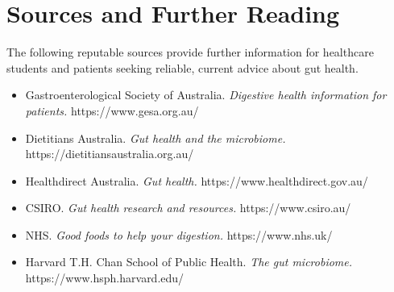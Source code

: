 \section*{Sources and Further Reading}
The following reputable sources provide further information for healthcare students and patients seeking reliable, current advice about gut health.

\begin{itemize}
    \item Gastroenterological Society of Australia. \textit{Digestive health information for patients.} https://www.gesa.org.au/
    \item Dietitians Australia. \textit{Gut health and the microbiome.} https://dietitiansaustralia.org.au/
    \item Healthdirect Australia. \textit{Gut health.} https://www.healthdirect.gov.au/
    \item CSIRO. \textit{Gut health research and resources.} https://www.csiro.au/
    \item NHS. \textit{Good foods to help your digestion.} https://www.nhs.uk/
    \item Harvard T.H. Chan School of Public Health. \textit{The gut microbiome.} https://www.hsph.harvard.edu/
\end{itemize}
